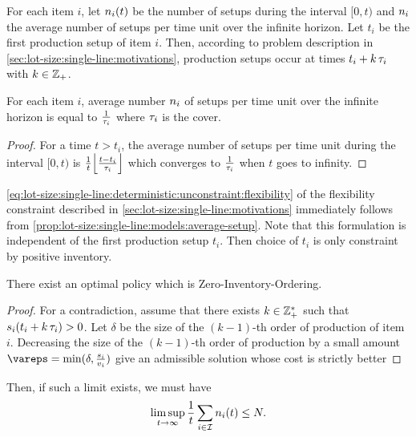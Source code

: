 For each item $i$, let $\freq_i\bracket{t}$ be the number of setups during the interval $[0,t)$ and $n_i$ the average number of setups per time unit over the infinite horizon.
Let $t_i$ be the first production setup of item $i$.
Then, according to problem description in \cref{sec:lot-size:single-line:motivations}, production setups occur at times $t_i+k\,\tau_i$ with $k\in\mathbb{Z}_+$.


\begin{prop}
For each item $i$, average number $n_i$ of setups per time unit over the infinite horizon is equal to $\frac{1}{\tau_i}$ where $\tau_i$ is the cover.
\end{prop}


\begin{proof}\label{prop:lot-size:single-line:models:average-setup}
For a time $t>t_i$, the average number of setups per time unit during the interval $[0,t)$ is
$\frac{1}{t}\left\lfloor\frac{t-t_i}{\cover_i}\right\rfloor$
which converges to $\frac{1}{\tau_i}$ when $t$ goes to infinity.
\end{proof}


\cref{eq:lot-size:single-line:deterministic:unconstraint:flexibility} of the flexibility constraint described in \cref{sec:lot-size:single-line:motivations} immediately follows from \cref{prop:lot-size:single-line:models:average-setup}.
Note that this formulation is independent of the first production setup $t_i$.
Then choice of $t_i$ is only constraint by positive inventory.


\begin{prop}
There exist an optimal policy which is Zero-Inventory-Ordering.
\end{prop}


\begin{proof}
For a contradiction, assume that there exists $k\in\mathbb{Z}_+^*$ such that $\inventory_i\bracket{t_i+k\,\cover_i}>0$.
Let $\delta$ be the size of the $(k-1)$-th order of production of item $i$.
Decreasing the size of the $(k-1)$-th order of production by a small amount $\vareps=\min(\delta,\frac{\inventory_i}{\rate_i})$ give an admissible solution whose cost is strictly better
\end{proof}


Then, if such a limit exists, we must have
\begin{equation}
  \limsup_{t\rightarrow\infty}\frac{1}{t} \sum_{i\in\REF}\freq_i\bracket{t}\le\nbsetups.
\end{equation}



